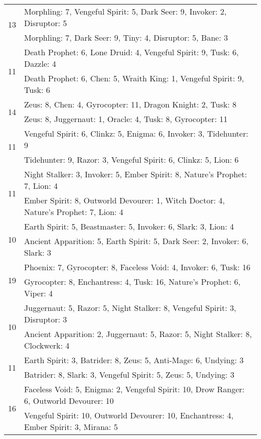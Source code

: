 \begin{table}[H]
\begin{tabular}{ | c | p{12.5cm} | }
\hline
\multirow{2}{*}{13}
& Morphling: 7, Vengeful Spirit: 5, Dark Seer: 9, Invoker: 2, Disruptor: 5 \\
& Morphling: 7, Dark Seer: 9, Tiny: 4, Disruptor: 5, Bane: 3 \\
\hline
\multirow{2}{*}{11}
& Death Prophet: 6, Lone Druid: 4, Vengeful Spirit: 9, Tusk: 6, Dazzle: 4 \\
& Death Prophet: 6, Chen: 5, Wraith King: 1, Vengeful Spirit: 9, Tusk: 6 \\
\hline
\multirow{2}{*}{14}
& Zeus: 8, Chen: 4, Gyrocopter: 11, Dragon Knight: 2, Tusk: 8 \\
& Zeus: 8, Juggernaut: 1, Oracle: 4, Tusk: 8, Gyrocopter: 11 \\
\hline
\multirow{2}{*}{11}
& Vengeful Spirit: 6, Clinkz: 5, Enigma: 6, Invoker: 3, Tidehunter: 9 \\
& Tidehunter: 9, Razor: 3, Vengeful Spirit: 6, Clinkz: 5, Lion: 6 \\
\hline
\multirow{2}{*}{11}
& Night Stalker: 3, Invoker: 5, Ember Spirit: 8, Nature's Prophet: 7, Lion: 4 \\
& Ember Spirit: 8, Outworld Devourer: 1, Witch Doctor: 4, Nature's Prophet: 7, Lion: 4 \\
\hline
\multirow{2}{*}{10}
& Earth Spirit: 5, Beastmaster: 5, Invoker: 6, Slark: 3, Lion: 4 \\
& Ancient Apparition: 5, Earth Spirit: 5, Dark Seer: 2, Invoker: 6, Slark: 3 \\
\hline
\multirow{2}{*}{19}
& Phoenix: 7, Gyrocopter: 8, Faceless Void: 4, Invoker: 6, Tusk: 16 \\
& Gyrocopter: 8, Enchantress: 4, Tusk: 16, Nature's Prophet: 6, Viper: 4 \\
\hline
\multirow{2}{*}{10}
& Juggernaut: 5, Razor: 5, Night Stalker: 8, Vengeful Spirit: 3, Disruptor: 3 \\
& Ancient Apparition: 2, Juggernaut: 5, Razor: 5, Night Stalker: 8, Clockwerk: 4 \\
\hline
\multirow{2}{*}{11}
& Earth Spirit: 3, Batrider: 8, Zeus: 5, Anti-Mage: 6, Undying: 3 \\
& Batrider: 8, Slark: 3, Vengeful Spirit: 5, Zeus: 5, Undying: 3 \\
\hline
\multirow{2}{*}{16}
& Faceless Void: 5, Enigma: 2, Vengeful Spirit: 10, Drow Ranger: 6, Outworld Devourer: 10 \\
& Vengeful Spirit: 10, Outworld Devourer: 10, Enchantress: 4, Ember Spirit: 3, Mirana: 5 \\
\hline
    \end{tabular}
    \caption{}
    \label{}
    \end{table}

   

